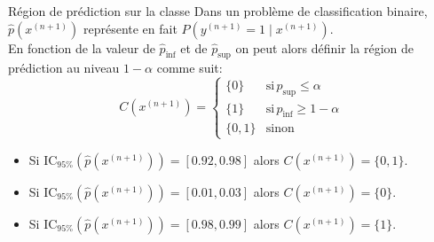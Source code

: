 \begin{frame}{Région de prédiction sur la classe}
	Dans un problème de classification binaire, $\hat{p}\left(x^{(n+1)}\right)$ représente en fait $P(y^{(n+1)} = 1 \mid x^{(n+1)})$. \\
	En fonction de la valeur de $\hat{p}_{\text{inf}}$ et de $\hat{p}_{\text{sup}}$ on peut alors définir la région de prédiction au niveau $1 - \alpha$ comme suit:
	\begin{equation}
		C\left(x^{(n+1)}\right) = 
		\begin{cases}
			\{0\} & \text{si} \, \hat{p}_{\text{sup}} \le \alpha \\
			\{1\} & \text{si} \, \hat{p}_{\text{inf}} \ge 1 - \alpha \\
			\{0, 1\} & \text{sinon}
		\end{cases}
		\nonumber
	\end{equation}
	\pause
	\begin{itemize}
		\item Si $\text{IC}_{95\%}\left(\hat{p}\left(x^{(n+1)}\right)\right) = [0.92, 0.98]$ alors $C\left(x^{(n+1)}\right) = \{0, 1\}$.
		\item Si $\text{IC}_{95\%}\left(\hat{p}\left(x^{(n+1)}\right)\right) = [0.01, 0.03]$ alors $C\left(x^{(n+1)}\right) = \{0\}$.
		\item Si $\text{IC}_{95\%}\left(\hat{p}\left(x^{(n+1)}\right)\right) = [0.98, 0.99]$ alors $C\left(x^{(n+1)}\right) = \{1\}$.
	\end{itemize}
\end{frame}
